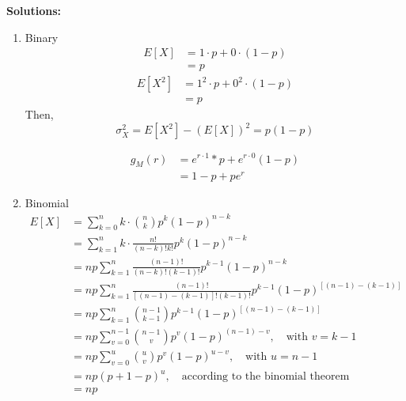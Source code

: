 \documentclass[UTF8]{article}
\begin{document}
    \textbf{Solutions:}
    \begin{enumerate}
        \item Binary
            \begin{equation*}
                \begin{split}
                    E[X] &= 1\cdot p+0\cdot(1-p)\\
                    &=p                    
                \end{split}            
            \end{equation*}
            \begin{equation*}
                \begin{split}
                    E[X^2] &= 1^2\cdot p+0^2\cdot(1-p)\\
                    &= p
                \end{split}
            \end{equation*}
        Then, 
            \begin{equation*}
                \sigma^2_X=E[X^2]-(E[X])^2=p(1-p)
            \end{equation*}
            
            \begin{equation*}
                \begin{split}
                    g_M(r) &= e^{r\cdot1}*p+e^{r\cdot0}(1-p)\\
                    &=1-p+pe^r
                \end{split}
            \end{equation*}
        \item Binomial
            \begin{equation*}
                \begin{split}
                    E[X] &=\sum^n_{k=0}k\cdot\binom{n}{k}p^k(1-p)^{n-k}\\
                    &=\sum^n_{k=1}k\cdot\frac{n!}{(n-k)!k!}p^k(1-p)^{n-k}\\
                    &=np\sum^n_{k=1}\frac{(n-1)!}{(n-k)!(k-1)!}p^{k-1}(1-p)^{n-k}\\
                    &=np\sum^{n}_{k=1}\frac{(n-1)!}{[(n-1)-(k-1)]!(k-1)!}p^{k-1}(1-p)^{[(n-1)-(k-1)]}\\
                    &=np\sum^{n}_{k=1}\binom{n-1}{k-1}p^{k-1}(1-p)^{[(n-1)-(k-1)]}\\
                    &=np\sum^{n-1}_{v=0}\binom{n-1}{v}p^v(1-p)^{(n-1)-v},\quad\text{with $v=k-1$}\\
                    &=np\sum^{u}_{v=0}\binom{u}{v}p^v(1-p)^{u-v},\quad\text{with $u=n-1$}\\
                    &=np(p+1-p)^u,\quad\text{according to the binomial theorem }\\
                    &=np
                \end{split}
            \end{equation*}


\end{enumerate}
\end{document}
